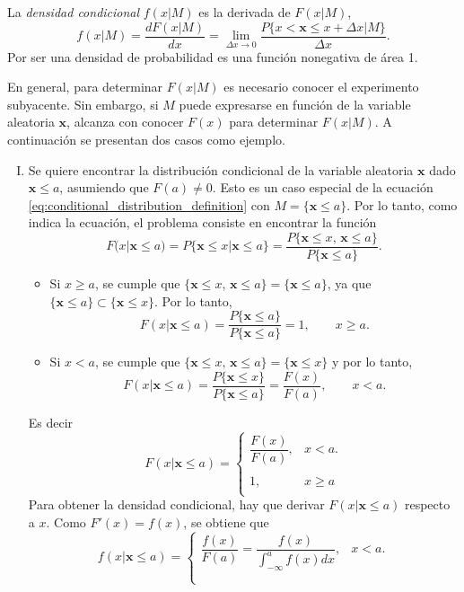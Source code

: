 \documentclass[a4paper]{report}
\newcommand{\x}{\mathbf{x}}
\begin{document}
La \emph{densidad condicional} \(f(x|M)\) es la derivada de \(F(x|M)\),
\[
 f(x|M)=\frac{dF(x|M)}{dx}=\lim_{\Delta x\to 0}\frac{P\{x<\x\leq x+\Delta x|M\}}{\Delta x}.
\]
Por ser una densidad de probabilidad es una función nonegativa de área 1.

En general, para determinar \(F(x|M)\) es necesario conocer el experimento subyacente. Sin embargo, si \(M\) puede expresarse en función de la variable aleatoria \(\x\), alcanza con conocer \(F(x)\) para determinar \(F(x|M)\). A continuación se presentan dos casos como ejemplo.
\begin{enumerate}[I.]
 \item Se quiere encontrar la distribución condicional de la variable aleatoria \(\x\) dado \(\x\leq a\), asumiendo que \(F(a)\neq 0\). Esto es un caso especial de la ecuación \ref{eq:conditional_distribution_definition} con \(M=\{\x\leq a\}\). Por lo tanto, como indica la ecuación, el problema consiste en encontrar la función
 \[
  F(x|\x\leq a)=P\{\x\leq x|\x\leq a\}=\frac{P\{\x\leq x,\,\x\leq a\}}{P\{\x\leq a\}}.
 \]
 \begin{itemize}
  \item Si \(x\geq a\), se cumple que \(\{\x\leq x,\,\x\leq a\}=\{\x\leq a\}\), ya que \(\{\x\leq a\}\subset\{\x\leq x\}\). Por lo tanto,
 \[
  F(x|\x\leq a)=\frac{P\{\x\leq a\}}{P\{\x\leq a\}}=1,\qquad x\geq a.
 \]
 \item Si \(x < a\), se cumple que \(\{\x\leq x,\,\x\leq a\}=\{\x\leq x\}\) y por lo tanto,
 \[
  F(x|\x\leq a)=\frac{P\{\x\leq x\}}{P\{\x\leq a\}}=\frac{F(x)}{F(a)},\qquad x<a.
 \]
 \end{itemize}
 Es decir
 \begin{equation}\label{eq:rv_conditional_distribution_x_leq_a}
 F(x|\x\leq a)=
 \left\{\begin{array}{ll}
 \dfrac{F(x)}{F(a)}, & x<a.\\
  \\
  1, & x\geq a \\
 \end{array} \right.
 \end{equation}
 Para obtener la densidad condicional, hay que derivar \(F(x|\x\leq a)\) respecto a \(x\). Como \(F'(x)=f(x)\), se obtiene que
 \begin{equation}\label{eq:rv_conditional_density_x_leq_a}
   f(x|\x\leq a)=
 \left\{\begin{array}{ll}
 \dfrac{f(x)}{F(a)}=\dfrac{f(x)}{\int_{-\infty}^{a}f(x)dx}, & x<a.\\
  \\

\end{array}
\end{equation}
\end{enumerate}
\end{document}

